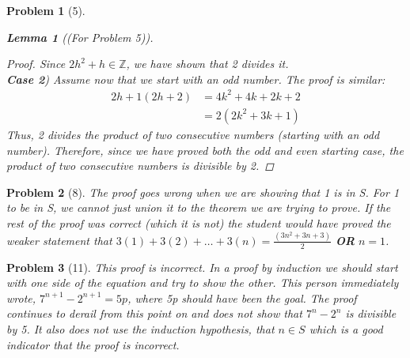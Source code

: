 \documentclass{article}
\theoremstyle{problem}
\newtheorem{prob}{Problem}
\theoremstyle{plain}
\newtheorem{lem}{Lemma}
\begin{document}
\begin{prob}[5]
\begin{multicols}{2}
\begin{lem}[(For Problem 5)]
\begin{proof}
          Since $2h^2 + h \in \mathbb{Z}$, we have shown that 2 divides it.\\[5pt]
        \textbf{Case 2}) Assume now that we start with an odd number. The proof is similar:
          \begin{align*}
            2h+1(2h+2) &= 4k^2 + 4k + 2k +2\\
            &= 2(2k^2 + 3k + 1)
          \end{align*} 
          Thus, 2 divides the product of two consecutive numbers (starting with an odd number).
        Therefore, since we have proved both the odd and even starting case, the product of two consecutive numbers is divisible by 2.
      \end{proof}      
    \end{lem}
  \end{multicols}
  \end{prob}

  \begin{prob}[8]
    The proof goes wrong when we are showing that 1 is in S. For 1 to be in S, we cannot just union it to the theorem we are trying to prove. If the rest of the proof was correct (which it is not) the student would have proved the weaker statement that $3(1) + 3(2) + \ldots + 3(n) = \frac{(3n^2 + 3n + 3)}{2}$ \textbf{OR} $n = 1$.
  \end{prob}

  \begin{prob}[11]
    This proof is incorrect. In a proof by induction we should start with one side of the equation and try to show the other. This person immediately wrote, $7^{n+1}-2^{n+1} = 5p$, where 5p should have been the goal. The proof continues to derail from this point on and does not show that $7^n - 2^n$ is divisible by 5. It also does not use the induction hypothesis, that $n \in S$ which is a good indicator that the proof is incorrect.
  \end{prob}
\end{document}
